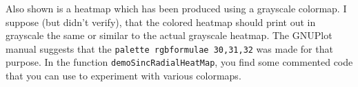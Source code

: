 \documentclass[11pt]{article}
\begin{document}
Also shown is a heatmap which has been produced using a grayscale colormap. I suppose (but didn't verify), that the colored heatmap should print out in grayscale the same or similar to the actual grayscale heatmap. The GNUPlot manual suggests that the \texttt{palette rgbformulae 30,31,32} was made for that purpose. In the function \texttt{demoSincRadialHeatMap}, you find some commented code that you can use to experiment with various colormaps.

\end{document}
